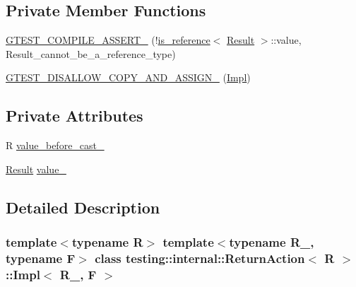 \subsection*{Private Member Functions}
\begin{DoxyCompactItemize}
\item 
\hyperlink{classtesting_1_1internal_1_1ReturnAction_1_1Impl_aa78abb95d718d193f787e9235818caca}{G\+T\+E\+S\+T\+\_\+\+C\+O\+M\+P\+I\+L\+E\+\_\+\+A\+S\+S\+E\+R\+T\+\_\+} (!\hyperlink{structtesting_1_1internal_1_1is__reference}{is\+\_\+reference}$<$ \hyperlink{classtesting_1_1internal_1_1ReturnAction_1_1Impl_a681fdf18258f86ea31efe0c55217e571}{Result} $>$\+::value, Result\+\_\+cannot\+\_\+be\+\_\+a\+\_\+reference\+\_\+type)
\item 
\hyperlink{classtesting_1_1internal_1_1ReturnAction_1_1Impl_abc88338b2f0a633f71eccacb81d03fba}{G\+T\+E\+S\+T\+\_\+\+D\+I\+S\+A\+L\+L\+O\+W\+\_\+\+C\+O\+P\+Y\+\_\+\+A\+N\+D\+\_\+\+A\+S\+S\+I\+G\+N\+\_\+} (\hyperlink{classtesting_1_1internal_1_1ReturnAction_1_1Impl}{Impl})
\end{DoxyCompactItemize}
\subsection*{Private Attributes}
\begin{DoxyCompactItemize}
\item 
R \hyperlink{classtesting_1_1internal_1_1ReturnAction_1_1Impl_a0dbd2f08128302c1395063f84f661366}{value\+\_\+before\+\_\+cast\+\_\+}
\item 
\hyperlink{classtesting_1_1internal_1_1ReturnAction_1_1Impl_a681fdf18258f86ea31efe0c55217e571}{Result} \hyperlink{classtesting_1_1internal_1_1ReturnAction_1_1Impl_a75916c30e7f8bb0388f3313788f25fa5}{value\+\_\+}
\end{DoxyCompactItemize}


\subsection{Detailed Description}
\subsubsection*{template$<$typename R$>$\newline
template$<$typename R\+\_\+, typename F$>$\newline
class testing\+::internal\+::\+Return\+Action$<$ R $>$\+::\+Impl$<$ R\+\_\+, F $>$}



